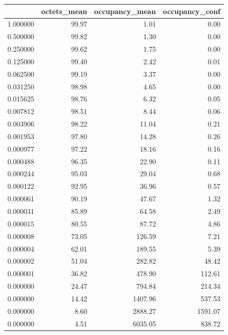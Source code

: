 \begin{tabular}{lrrr}
\toprule
 & octets_mean & occupancy_mean & occupancy_conf \\
\midrule
1.000000 & 99.97 & 1.01 & 0.00 \\
0.500000 & 99.82 & 1.30 & 0.00 \\
0.250000 & 99.62 & 1.75 & 0.00 \\
0.125000 & 99.40 & 2.42 & 0.01 \\
0.062500 & 99.19 & 3.37 & 0.00 \\
0.031250 & 98.98 & 4.65 & 0.00 \\
0.015625 & 98.76 & 6.32 & 0.05 \\
0.007812 & 98.51 & 8.44 & 0.06 \\
0.003906 & 98.22 & 11.04 & 0.21 \\
0.001953 & 97.80 & 14.28 & 0.26 \\
0.000977 & 97.22 & 18.16 & 0.16 \\
0.000488 & 96.35 & 22.90 & 0.11 \\
0.000244 & 95.03 & 29.04 & 0.68 \\
0.000122 & 92.95 & 36.96 & 0.57 \\
0.000061 & 90.19 & 47.67 & 1.32 \\
0.000031 & 85.89 & 64.58 & 2.49 \\
0.000015 & 80.55 & 87.72 & 4.86 \\
0.000008 & 73.05 & 126.59 & 7.21 \\
0.000004 & 62.01 & 189.55 & 5.39 \\
0.000002 & 51.04 & 282.82 & 48.42 \\
0.000001 & 36.82 & 478.90 & 112.61 \\
0.000000 & 24.47 & 794.84 & 214.34 \\
0.000000 & 14.42 & 1407.96 & 537.53 \\
0.000000 & 8.60 & 2888.27 & 1591.07 \\
0.000000 & 4.51 & 6035.05 & 838.72 \\
\bottomrule
\end{tabular}
